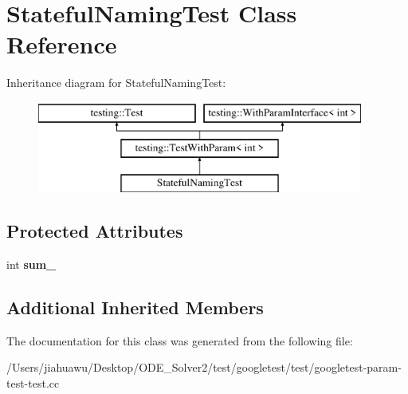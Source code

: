 \hypertarget{class_stateful_naming_test}{}\section{Stateful\+Naming\+Test Class Reference}
\label{class_stateful_naming_test}
Inheritance diagram for Stateful\+Naming\+Test\+:\begin{figure}[H]
\begin{center}
\leavevmode
\includegraphics[height=3.000000cm]{class_stateful_naming_test}
\end{center}
\end{figure}
\subsection*{Protected Attributes}
\begin{DoxyCompactItemize}
\item 
\mbox{\label{class_stateful_naming_test_ad719a1c2919c304bfe840313142a376a}} 
int {\bfseries sum\+\_\+}
\end{DoxyCompactItemize}
\subsection*{Additional Inherited Members}


The documentation for this class was generated from the following file\+:\begin{DoxyCompactItemize}
\item 
/\+Users/jiahuawu/\+Desktop/\+O\+D\+E\+\_\+\+Solver2/test/googletest/test/googletest-\/param-\/test-\/test.\+cc\end{DoxyCompactItemize}

